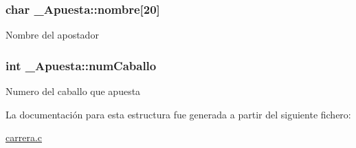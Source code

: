 \subsubsection[{\texorpdfstring{nombre}{nombre}}]{\setlength{\rightskip}{0pt plus 5cm}char \+\_\+\+Apuesta\+::nombre\mbox{[}20\mbox{]}}\hypertarget{struct__Apuesta_ae4d7fe3277098d3c32d34b435408873e}{}\label{struct__Apuesta_ae4d7fe3277098d3c32d34b435408873e}
Nombre del apostador 
\subsubsection[{\texorpdfstring{num\+Caballo}{numCaballo}}]{\setlength{\rightskip}{0pt plus 5cm}int \+\_\+\+Apuesta\+::num\+Caballo}\hypertarget{struct__Apuesta_a217a68a637b2db3e61068bafc18ef1ac}{}\label{struct__Apuesta_a217a68a637b2db3e61068bafc18ef1ac}
Numero del caballo que apuesta 

La documentación para esta estructura fue generada a partir del siguiente fichero\+:\begin{DoxyCompactItemize}
\item 
\hyperlink{carrera_8c}{carrera.\+c}\end{DoxyCompactItemize}
